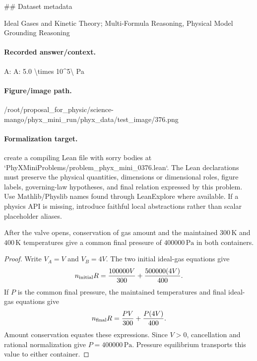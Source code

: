 \#\# Dataset metadata

Ideal Gases and Kinetic Theory; Multi-Formula Reasoning, Physical Model Grounding Reasoning

\paragraph{Recorded answer/context.}
A: A: 5.0 \textbackslash{}times 10\textasciicircum{}5\textbackslash{} Pa

\paragraph{Figure/image path.}
/root/proposal\_for\_physic/science-mango/phyx\_mini\_run/phyx\_data/test\_image/376.png

\paragraph{Formalization target.}
create a compiling Lean file with sorry bodies at `PhyXMiniProblems/problem\_phyx\_mini\_0376.lean`. The Lean declarations must preserve the physical quantities, dimensions or dimensional roles, figure labels, governing-law hypotheses, and final relation expressed by this problem.
Use Mathlib/Physlib names found through LeanExplore where available. If a physics API is missing, introduce faithful local abstractions rather than scalar placeholder aliases.

\begin{theorem}
\label{thm:physics:phyx_mini_0376:target}
After the valve opens, conservation of gas amount and the maintained
\(300\,\mathrm K\) and \(400\,\mathrm K\) temperatures give a common final
pressure of \(400000\,\mathrm{Pa}\) in both containers.
\end{theorem}
\begin{proof}
Write \(V_A=V\) and \(V_B=4V\).  The two initial ideal-gas equations give
\[
 n_{\rm initial}R
 =\frac{100000V}{300}+\frac{500000(4V)}{400}.
\]
If \(P\) is the common final pressure, the maintained temperatures and final
ideal-gas equations give
\[
 n_{\rm final}R=\frac{PV}{300}+\frac{P(4V)}{400}.
\]
Amount conservation equates these expressions.  Since \(V>0\), cancellation
and rational normalization give \(P=400000\,\mathrm{Pa}\).  Pressure
equilibrium transports this value to either container.
\end{proof}

